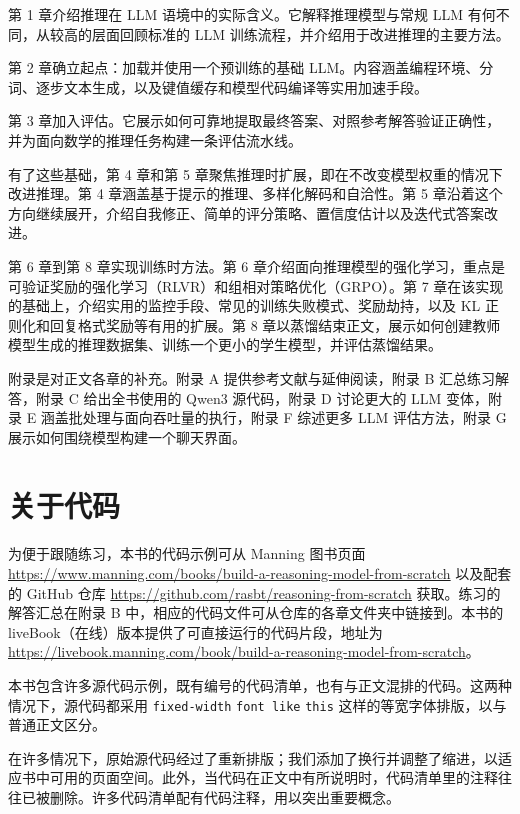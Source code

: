 第 1 章介绍推理在 LLM 语境中的实际含义。它解释推理模型与常规 LLM 有何不同，从较高的层面回顾标准的 LLM 训练流程，并介绍用于改进推理的主要方法。

第 2 章确立起点：加载并使用一个预训练的基础 LLM。内容涵盖编程环境、分词、逐步文本生成，以及键值缓存和模型代码编译等实用加速手段。

第 3 章加入评估。它展示如何可靠地提取最终答案、对照参考解答验证正确性，并为面向数学的推理任务构建一条评估流水线。

有了这些基础，第 4 章和第 5 章聚焦推理时扩展，即在不改变模型权重的情况下改进推理。第 4 章涵盖基于提示的推理、多样化解码和自洽性。第 5 章沿着这个方向继续展开，介绍自我修正、简单的评分策略、置信度估计以及迭代式答案改进。

第 6 章到第 8 章实现训练时方法。第 6 章介绍面向推理模型的强化学习，重点是可验证奖励的强化学习（RLVR）和组相对策略优化（GRPO）。第 7 章在该实现的基础上，介绍实用的监控手段、常见的训练失败模式、奖励劫持，以及 KL 正则化和回复格式奖励等有用的扩展。第 8 章以蒸馏结束正文，展示如何创建教师模型生成的推理数据集、训练一个更小的学生模型，并评估蒸馏结果。

附录是对正文各章的补充。附录 A 提供参考文献与延伸阅读，附录 B 汇总练习解答，附录 C 给出全书使用的 Qwen3 源代码，附录 D 讨论更大的 LLM 变体，附录 E 涵盖批处理与面向吞吐量的执行，附录 F 综述更多 LLM 评估方法，附录 G 展示如何围绕模型构建一个聊天界面。

\section*{关于代码}

为便于跟随练习，本书的代码示例可从 Manning 图书页面 \href{https://www.manning.com/books/build-a-reasoning-model-from-scratch}{https://www.manning.com/books/build-a-reasoning-model-from-scratch} 以及配套的 GitHub 仓库 \href{https://github.com/rasbt/reasoning-from-scratch}{https://github.com/rasbt/reasoning-from-scratch} 获取。练习的解答汇总在附录 B 中，相应的代码文件可从仓库的各章文件夹中链接到。本书的 liveBook（在线）版本提供了可直接运行的代码片段，地址为 \href{https://livebook.manning.com/book/build-a-reasoning-model-from-scratch}{https://livebook.manning.com/book/build-a-reasoning-model-from-scratch}。

本书包含许多源代码示例，既有编号的代码清单，也有与正文混排的代码。这两种情况下，源代码都采用 \texttt{fixed-width} \texttt{font like} \texttt{this} 这样的等宽字体排版，以与普通正文区分。

在许多情况下，原始源代码经过了重新排版；我们添加了换行并调整了缩进，以适应书中可用的页面空间。此外，当代码在正文中有所说明时，代码清单里的注释往往已被删除。许多代码清单配有代码注释，用以突出重要概念。

